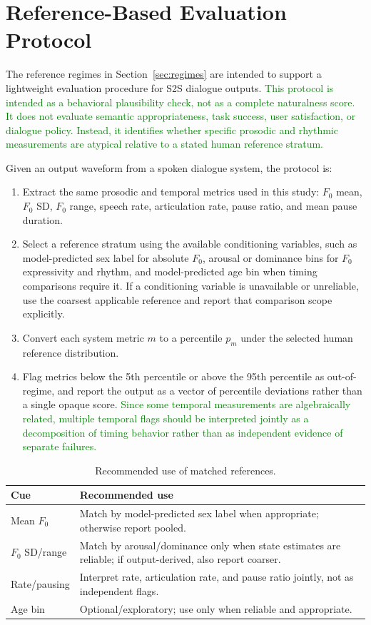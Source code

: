 \documentclass[conference]{IEEEtran}
\begin{document}
\section{Reference-Based Evaluation Protocol}\label{sec:evaluation_protocol}

The reference regimes in Section~\ref{sec:regimes} are intended to support a lightweight evaluation procedure for S2S dialogue outputs. 
\textcolor{green}{This protocol is intended as a behavioral plausibility check, not as a complete naturalness score. 
It does not evaluate semantic appropriateness, task success, user satisfaction, or dialogue policy. Instead, it identifies whether specific prosodic and rhythmic measurements are atypical relative to a stated human reference stratum.}

Given an output waveform from a spoken dialogue system, the protocol is:
\begin{enumerate}
    \item Extract the same prosodic and temporal metrics used in this study: $F_0$ mean, $F_0$ SD, $F_0$ range, speech rate, articulation rate, pause ratio, and mean pause duration.
    \item Select a reference stratum using the available conditioning variables, such as model-predicted sex label for absolute $F_0$, arousal or dominance bins for $F_0$ expressivity and rhythm, and model-predicted age bin when timing comparisons require it. If a conditioning variable is unavailable or unreliable, use the coarsest applicable reference and report that comparison scope explicitly.
    \item Convert each system metric $m$ to a percentile $p_m$ under the selected human reference distribution.
    \item Flag metrics below the 5th percentile or above the 95th percentile as out-of-regime, and report the output as a vector of percentile deviations rather than a single opaque score. \textcolor{green}{Since some temporal measurements are algebraically related, multiple temporal flags should be interpreted jointly as a decomposition of timing behavior rather than as independent evidence of separate failures.}
\end{enumerate}

\begin{table}[t]
\centering
\caption{Recommended use of matched references.}
\label{tab:practical_guidance}
\scriptsize
\setlength{\tabcolsep}{2.4pt}
\begin{tabular}{p{}p{}}
\toprule
Cue & Recommended use \\
\midrule
Mean $F_0$ & Match by model-predicted sex label when appropriate; otherwise report pooled. \\
$F_0$ SD/range & Match by arousal/dominance only when state estimates are reliable; if output-derived, also report coarser. \\
Rate/pausing & Interpret rate, articulation rate, and pause ratio jointly, not as independent flags. \\
Age bin & Optional/exploratory; use only when reliable and appropriate. \\
\bottomrule
\end{tabular}
\end{table}
\end{document}
